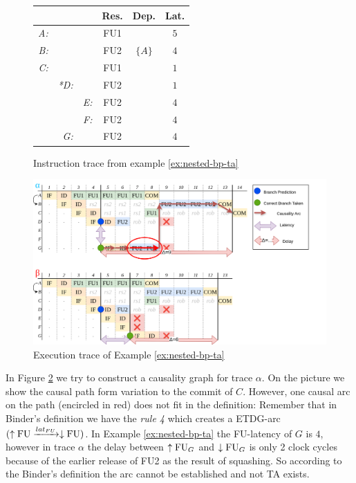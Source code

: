 \begin{figure}[H]
    \centering
    \begin{tabular}{rrr|ccc}
    &  &  & Res. & Dep. & Lat. \\ \hline
    \textit{A:} &  &  & FU1 &  & $5$ \\
    \textit{B:} &  &  & FU2 & $\{A\}$ & $4$ \\
    \textit{C:} &  &  & FU1 &  & $1$ \\
    & \textit{*D:} &  & FU2 &  & $1$ \\
    &  & \textit{E:} & FU2 &  & $4$ \\
    &  & \textit{F:} & FU2 &  & $4$ \\
    & \textit{G:} &  & FU2 &  & $4$ \\
    \end{tabular}
    \caption{Instruction trace from example \ref{ex:nested-bp-ta}}
    \label{fig:nested-bp-ta-input}
\end{figure}


\begin{figure}[H]
    \centering
    \includegraphics[width=\textwidth]{figures/nested-bp-ta.png}
    \caption{Execution trace of Example \ref{ex:nested-bp-ta}}
    \label{fig:nested-bp-ta-trace}
\end{figure}


In Figure \ref{fig:nested-bp-ta-trace} we try to construct a causality graph for trace $\alpha$. On the picture we show the causal path form variation to the commit of $C$. However, one causal arc on the path (encircled in red) does not fit in the definition: Remember that in Binder's definition we have the \textit{rule 4} which creates a ETDG-arc $(\uparrow\mathrm{FU} \xrightarrow{lat_{FU}} \downarrow\mathrm{FU})$. In Example \ref{ex:nested-bp-ta} the FU-latency of $G$ is $4$, however in trace $\alpha$ the delay between $\uparrow\mathrm{FU}_G$ and $\downarrow\mathrm{FU}_G$ is only 2 clock cycles because of the earlier release of FU2 as the result of squashing. So according to the Binder's definition the arc cannot be established and not TA exists.

